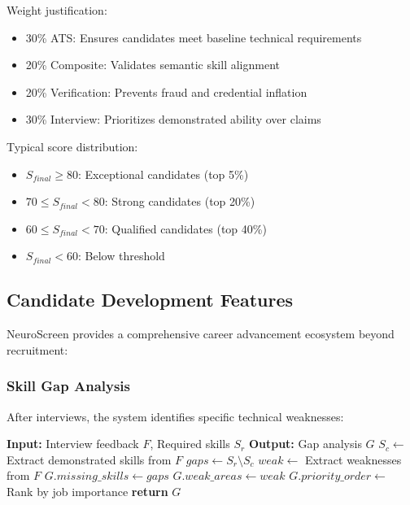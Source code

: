 \documentclass[conference]{IEEEtran}
\begin{document}
Weight justification:
\begin{itemize}
    \item 30\% ATS: Ensures candidates meet baseline technical requirements
    \item 20\% Composite: Validates semantic skill alignment
    \item 20\% Verification: Prevents fraud and credential inflation
    \item 30\% Interview: Prioritizes demonstrated ability over claims
\end{itemize}

Typical score distribution:
\begin{itemize}
    \item $S_{final} \geq 80$: Exceptional candidates (top 5\%)
    \item $70 \leq S_{final} < 80$: Strong candidates (top 20\%)
    \item $60 \leq S_{final} < 70$: Qualified candidates (top 40\%)
    \item $S_{final} < 60$: Below threshold
\end{itemize}

\subsection{Candidate Development Features}

NeuroScreen provides a comprehensive career advancement ecosystem beyond recruitment:

\subsubsection{Skill Gap Analysis}

After interviews, the system identifies specific technical weaknesses:

\begin{algorithm}[h]
\caption{Skill Gap Identification}
\label{alg:skill_gap}
\begin{algorithmic}[1]
\STATE \textbf{Input:} Interview feedback $F$, Required skills $S_r$
\STATE \textbf{Output:} Gap analysis $G$
\STATE
\STATE $S_c \leftarrow$ Extract demonstrated skills from $F$
\STATE $gaps \leftarrow S_r \setminus S_c$
\STATE $weak \leftarrow$ Extract weaknesses from $F$
\STATE $G.missing\_skills \leftarrow gaps$
\STATE $G.weak\_areas \leftarrow weak$
\STATE $G.priority\_order \leftarrow$ Rank by job importance
\STATE \textbf{return} $G$
\end{algorithmic}
\end{algorithm}
\end{document}
